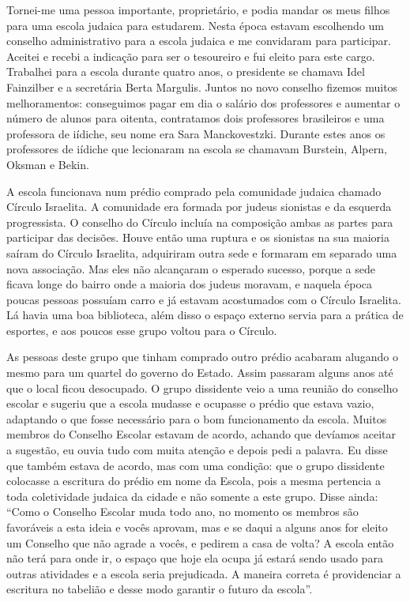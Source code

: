 Tornei-me uma pessoa importante, proprietário, e podia mandar os meus
filhos para uma escola judaica para estudarem. Nesta época estavam
escolhendo um conselho administrativo para a escola judaica e me
convidaram para participar. Aceitei e recebi a indicação para ser o
tesoureiro e fui eleito para este cargo. Trabalhei para a escola durante
quatro anos, o presidente se chamava Idel Fainzilber e a secretária
Berta Margulis. Juntos no novo conselho fizemos muitos melhoramentos:
conseguimos pagar em dia o salário dos professores e aumentar o número
de alunos para oitenta, contratamos dois professores brasileiros e uma
professora de iídiche, seu nome era Sara Manckovestzki. Durante estes
anos os professores de iídiche que lecionaram na escola se chamavam
Burstein, Alpern, Oksman e Bekin.

A escola funcionava num prédio comprado pela comunidade judaica chamado
Círculo Israelita. A comunidade era formada por judeus sionistas e da
esquerda progressista. O conselho do Círculo incluía na composição ambas
as partes para participar das decisões. Houve então uma ruptura e os
sionistas na sua maioria saíram do Círculo Israelita, adquiriram outra
sede e formaram em separado uma nova associação. Mas eles não alcançaram
o esperado sucesso, porque a sede ficava longe do bairro onde a maioria
dos judeus moravam, e naquela época poucas pessoas possuíam carro e já
estavam acostumados com o Círculo Israelita. Lá havia uma boa
biblioteca, além disso o espaço externo servia para a prática de
esportes, e aos poucos esse grupo voltou para o Círculo.

As pessoas deste grupo que tinham comprado outro prédio acabaram
alugando o mesmo para um quartel do governo do Estado. Assim passaram
alguns anos até que o local ficou desocupado. O grupo dissidente veio a
uma reunião do conselho escolar e sugeriu que a escola mudasse e
ocupasse o prédio que estava vazio, adaptando o que fosse necessário
para o bom funcionamento da escola. Muitos membros do Conselho Escolar
estavam de acordo, achando que devíamos aceitar a sugestão, eu ouvia
tudo com muita atenção e depois pedi a palavra. Eu disse que também
estava de acordo, mas com uma condição: que o grupo dissidente colocasse
a escritura do prédio em nome da Escola, pois a mesma pertencia a toda
coletividade judaica da cidade e não somente a este grupo. Disse ainda:
``Como o Conselho Escolar muda todo ano, no momento os membros são
favoráveis a esta ideia e vocês aprovam, mas e se daqui a alguns anos
for eleito um Conselho que não agrade a vocês, e pedirem a casa de
volta? A escola então não terá para onde ir, o espaço que hoje ela ocupa
já estará sendo usado para outras atividades e a escola seria
prejudicada. A maneira correta é providenciar a escritura no tabelião e
desse modo garantir o futuro da escola''.

